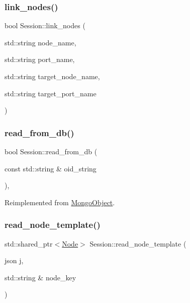 \mbox{\label{class_session_a5eec7c1012a9a058f06347dd3cb18de3}} 
\subsubsection{\texorpdfstring{link\+\_\+nodes()}{link\_nodes()}}
{\footnotesize\ttfamily bool Session\+::link\+\_\+nodes (\begin{DoxyParamCaption}\item[{std\+::string}]{node\+\_\+name,  }\item[{std\+::string}]{port\+\_\+name,  }\item[{std\+::string}]{target\+\_\+node\+\_\+name,  }\item[{std\+::string}]{target\+\_\+port\+\_\+name }\end{DoxyParamCaption})}

\mbox{\label{class_session_a4f09644fd155a1d5640cedefe4aa42fc}} 
\subsubsection{\texorpdfstring{read\+\_\+from\+\_\+db()}{read\_from\_db()}}
{\footnotesize\ttfamily bool Session\+::read\+\_\+from\+\_\+db (\begin{DoxyParamCaption}\item[{const std\+::string \&}]{oid\+\_\+string }\end{DoxyParamCaption})\hspace{0.3cm}{\ttfamily [final]}, {\ttfamily [virtual]}}



Reimplemented from \hyperlink{class_mongo_object_a729412e226c9964e13ba80688c3f5e00}{Mongo\+Object}.

\mbox{\label{class_session_a8d085cbe91c4ab1632e4eed199120123}} 
\subsubsection{\texorpdfstring{read\+\_\+node\+\_\+template()}{read\_node\_template()}}
{\footnotesize\ttfamily std\+::shared\+\_\+ptr$<$\hyperlink{class_node}{Node}$>$ Session\+::read\+\_\+node\+\_\+template (\begin{DoxyParamCaption}\item[{json}]{j,  }\item[{std\+::string \&}]{node\+\_\+key }\end{DoxyParamCaption})}

